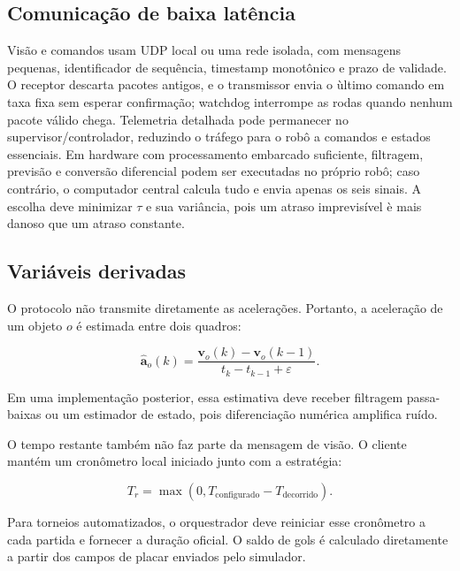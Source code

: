 \documentclass[12pt,a4paper]{article}
\newcommand{\vect}[1]{\boldsymbol{#1}}
\begin{document}
\subsection{Comunica\c{c}\~ao de baixa lat\^encia}

Vis\~ao e comandos usam UDP local ou uma rede isolada, com mensagens pequenas, identificador de sequ\^encia, timestamp monot\^onico e prazo de validade. O receptor descarta pacotes antigos, e o transmissor envia o \`ultimo comando em taxa fixa sem esperar confirma\c{c}\~ao; watchdog interrompe as rodas quando nenhum pacote v\'alido chega. Telemetria detalhada pode permanecer no supervisor/controlador, reduzindo o tr\'afego para o rob\^o a comandos e estados essenciais. Em hardware com processamento embarcado suficiente, filtragem, previs\~ao e convers\~ao diferencial podem ser executadas no pr\'oprio rob\^o; caso contr\'ario, o computador central calcula tudo e envia apenas os seis sinais. A escolha deve minimizar $\tau$ e sua vari\^ancia, pois um atraso imprevis\'ivel \`e mais danoso que um atraso constante.

\subsection{Vari\'aveis derivadas}

O protocolo n\~ao transmite diretamente as acelera\c{c}\~oes. Portanto, a acelera\c{c}\~ao de um objeto $o$ \'e estimada entre dois quadros:

\begin{equation}
  \widehat{\vect{a}}_o(k)
  =\frac{\vect{v}_o(k)-\vect{v}_o(k-1)}{t_k-t_{k-1}+\varepsilon}.
\end{equation}

Em uma implementa\c{c}\~ao posterior, essa estimativa deve receber filtragem passa-baixas ou um estimador de estado, pois diferencia\c{c}\~ao num\'erica amplifica ru\'ido.

O tempo restante tamb\'em n\~ao faz parte da mensagem de vis\~ao. O cliente mant\'em um cron\^ometro local iniciado junto com a estrat\'egia:

\begin{equation}
  T_r=\max(0,T_{\mathrm{configurado}}-T_{\mathrm{decorrido}}).
\end{equation}

Para torneios automatizados, o orquestrador deve reiniciar esse cron\^ometro a cada partida e fornecer a dura\c{c}\~ao oficial. O saldo de gols \'e calculado diretamente a partir dos campos de placar enviados pelo simulador.
\end{document}
